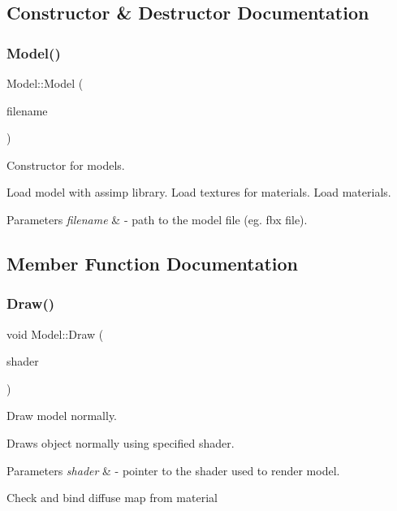 \subsection{Constructor \& Destructor Documentation}
\mbox{\label{class_model_a0521de97cb482940ccf4a416d35fa336}} 
\subsubsection{\texorpdfstring{Model()}{Model()}}
{\footnotesize\ttfamily Model\+::\+Model (\begin{DoxyParamCaption}\item[{G\+Lchar $\ast$}]{filename }\end{DoxyParamCaption})}



Constructor for models. 

Load model with assimp library. Load textures for materials. Load materials. 
\begin{DoxyParams}{Parameters}
{\em filename} & -\/ path to the model file (eg. fbx file). \\
\hline
\end{DoxyParams}


\subsection{Member Function Documentation}
\mbox{\label{class_model_a8444e404fcc9cc66827c2f628b92ece3}} 
\subsubsection{\texorpdfstring{Draw()}{Draw()}}
{\footnotesize\ttfamily void Model\+::\+Draw (\begin{DoxyParamCaption}\item[{\mbox{\hyperlink{class_shader}{Shader}} $\ast$}]{shader }\end{DoxyParamCaption})}



Draw model normally. 

Draws object normally using specified shader. 
\begin{DoxyParams}{Parameters}
{\em shader} & -\/ pointer to the shader used to render model. \\
\hline
\end{DoxyParams}
Check and bind diffuse map from material

